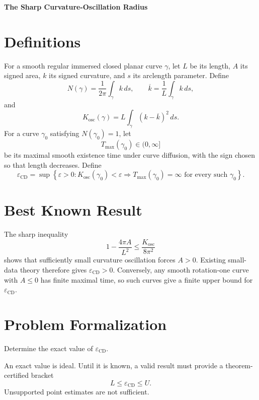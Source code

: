 \documentclass[10pt,a4paper]{article}
\theoremstyle{definition}
\begin{document}
\begin{center}
  {\Large\bfseries The Sharp Curvature-Oscillation Radius}
\end{center}

\section{Definitions}

For a smooth regular immersed closed planar curve $\gamma$, let $L$ be
its length, $A$ its signed area, $k$ its signed curvature, and $s$ its
arclength parameter. Define
\begin{equation}
  N(\gamma)
  =
  \frac{1}{2\pi}\int_\gamma k\,ds,
  \qquad
  \overline k
  =
  \frac{1}{L}\int_\gamma k\,ds,
\end{equation}
and
\begin{equation}
  K_{\mathrm{osc}}(\gamma)
  =
  L\int_\gamma(k-\overline k)^2\,ds.
\end{equation}
For a curve $\gamma_0$ satisfying $N(\gamma_0)=1$, let
\begin{equation}
  T_{\max}(\gamma_0)\in(0,\infty]
\end{equation}
be its maximal smooth existence time under curve diffusion, with the sign
chosen so that length decreases. Define
\begin{equation}
  \varepsilon_{\mathrm{CD}}
  =
  \sup\left\{
    \varepsilon>0:
    K_{\mathrm{osc}}(\gamma_0)<\varepsilon
    \Longrightarrow
    T_{\max}(\gamma_0)=\infty
    \text{ for every such }\gamma_0
  \right\}.
\end{equation}

\section{Best Known Result}

The sharp inequality
\begin{equation}
  1-\frac{4\pi A}{L^2}
  \leq
  \frac{K_{\mathrm{osc}}}{8\pi^2}
\end{equation}
shows that sufficiently small curvature oscillation forces $A>0$.
Existing small-data theory therefore gives
$\varepsilon_{\mathrm{CD}}>0$.
Conversely, any smooth rotation-one curve with $A\leq 0$ has finite maximal
time, so such curves give a finite upper bound for
$\varepsilon_{\mathrm{CD}}$.

\section{Problem Formalization}

Determine the exact value of $\varepsilon_{\mathrm{CD}}$.

An exact value is ideal. Until it is known, a valid result must provide a
theorem-certified bracket
\begin{equation}
  L\leq\varepsilon_{\mathrm{CD}}\leq U.
\end{equation}
Unsupported point estimates are not sufficient.
\end{document}
